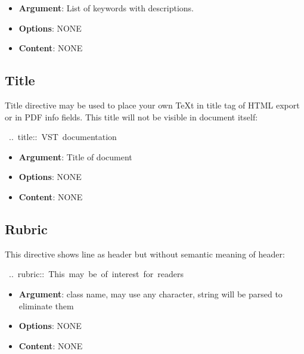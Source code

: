 \documentclass[12pt]{article}
\begin{document}
\begin{itemize}
\item
\textbf{Argument}: List of keywords with descriptions.

\item
\textbf{Options}: NONE

\item
\textbf{Content}: NONE
\end{itemize}
\hypertarget{ltitle}{}
\subsection{Title}

Title directive may be used to place your own \TeX{}t in title tag of HTML export
or in PDF info fields. This title will not be visible in document itself:

\begin{ttfamily}\begin{flushleft}
\mbox{~..~title::~VST~documentation}\\
\end{flushleft}\end{ttfamily}

\begin{itemize}
\item
\textbf{Argument}: Title of document

\item
\textbf{Options}: NONE

\item
\textbf{Content}: NONE
\end{itemize}
\hypertarget{lrubric}{}
\subsection{Rubric}

This directive shows line as header but without semantic meaning of header:

\begin{ttfamily}\begin{flushleft}
\mbox{~..~rubric::~This~may~be~of~interest~for~readers}\\
\end{flushleft}\end{ttfamily}

\begin{itemize}
\item
\textbf{Argument}: class name, may use any character, string will be parsed to
eliminate them

\item
\textbf{Options}: NONE

\item
\textbf{Content}: NONE
\end{itemize}
\hypertarget{lraw}{}
\end{document}
